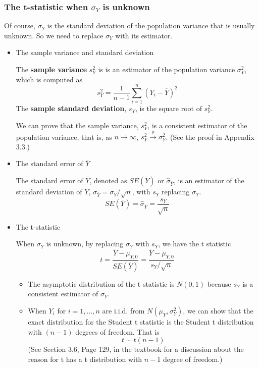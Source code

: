 \documentclass[a4paper,11pt]{article}
\begin{document}
\subsubsection*{The t-statistic when \(\sigma_Y\) is unknown}
\label{sec:org4317364}

Of course, \(\sigma_Y\) is the standard deviation of the population
variance that is usually unknown. So we need to replace \(\sigma_Y\)
with its estimator. 

\begin{itemize}
\item The sample variance and standard deviation
\label{sec:org482d3ff}

The \textbf{sample variance} \(s^2_Y\) is is an estimator of the population
variance \(\sigma^2_Y\), which is computed as
  \[ s^2_Y = \frac{1}{n-1}\sum^n_{i=1} (Y_i - \overline{Y})^2 \]
The \textbf{sample standard deviation}, \(s_Y\), is the square root of \(s^2_Y\). 

We can prove that the sample variance, \(s^2_Y\), is a consistent estimator of the
population variance, that is, as \(n \rightarrow \infty\), \(s^2_Y
\xrightarrow{\text{ p }} \sigma^2_Y\). (See the proof in
Appendix 3.3.)

\item The standard error of \(\overline{Y}\)
\label{sec:orgbbf467c}

The standard error of \(\overline{Y}\), denoted as \(SE(\overline{Y})\) or
\(\hat{\sigma}_{\overline{Y}}\), is an estimator of the standard
deviation of \(\overline{Y}\),
\(\sigma_{\overline{Y}}=\sigma_Y/\sqrt{n}\), with \(s_Y\) replacing
\(\sigma_Y\). 
\[ SE(\overline{Y}) = \hat{\sigma}_{\overline{Y}} =
\frac{s_Y}{\sqrt{n}} \]

\item The t-statistic
\label{sec:orgc67635c}

When \(\sigma_Y\) is unknown, by replacing \(\sigma_Y\) with \(s_Y\), we
have the t statistic 
  \[ t = \frac{\overline{Y} - \mu_{Y,0}}{SE(\overline{Y})} =
  \frac{\overline{Y} - \mu_{Y,0}}{s_Y/\sqrt{n}} \] 

\begin{itemize}
\item The asymptotic distribution of the t statistic is \(N(0, 1)\) because
\(s_Y\) is a consistent estimator of \(\sigma_Y\).

\item When \(Y_i\) for \(i=1, \ldots, n\) are i.i.d. from \(N(\mu_Y,
  \sigma_Y^{2})\), we can show that the exact distribution for the
Student t
statistic is the Student t distribution with \((n-1)\) degrees of
freedom. That is
\[ t \sim t(n-1)  \]
(See Section 3.6, Page 129, in the textbook for a discussion about the
reason for t has a t distribution with \(n-1\) degree of freedom.)
\end{itemize}
\end{itemize}
\end{document}
